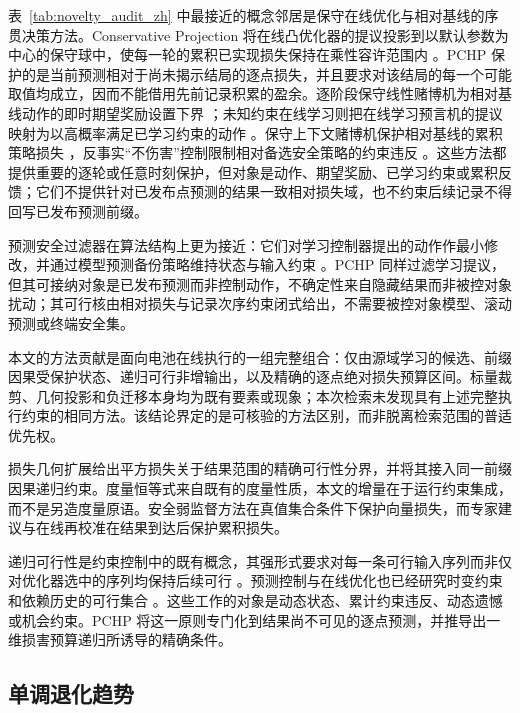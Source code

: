 \documentclass[UTF8,11pt]{ctexart}
\begin{document}
表~\ref{tab:novelty_audit_zh} 中最接近的概念邻居是保守在线优化与相对基线的序贯决策方法。Conservative Projection 将在线凸优化器的提议投影到以默认参数为中心的保守球中，使每一轮的累积已实现损失保持在乘性容许范围内 \citep{bernasconi2021conservative}。PCHP 保护的是当前预测相对于尚未揭示结局的逐点损失，并且要求对该结局的每一个可能取值均成立，因而不能借用先前记录积累的盈余。逐阶段保守线性赌博机为相对基线动作的即时期望奖励设置下界 \citep{moradipari2020stagewise}；未知约束在线学习则把在线学习预言机的提议映射为以高概率满足已学习约束的动作 \citep{sridharan2025unknown}。保守上下文赌博机保护相对基线的累积策略损失 \citep{deb2025conservative}，反事实“不伤害”控制限制相对备选安全策略的约束违反 \citep{vaskov2024donoharm}。这些方法都提供重要的逐轮或任意时刻保护，但对象是动作、期望奖励、已学习约束或累积反馈；它们不提供针对已发布点预测的结果一致相对损失域，也不约束后续记录不得回写已发布预测前缀。

预测安全过滤器在算法结构上更为接近：它们对学习控制器提出的动作作最小修改，并通过模型预测备份策略维持状态与输入约束 \citep{wabersich2021predictive}。PCHP 同样过滤学习提议，但其可接纳对象是已发布预测而非控制动作，不确定性来自隐藏结果而非被控对象扰动；其可行核由相对损失与记录次序约束闭式给出，不需要被控对象模型、滚动预测或终端安全集。

本文的方法贡献是面向电池在线执行的一组完整组合：仅由源域学习的候选、前缀因果受保护状态、递归可行非增输出，以及精确的逐点绝对损失预算区间。标量裁剪、几何投影和负迁移本身均为既有要素或现象；本次检索未发现具有上述完整执行约束的相同方法。该结论界定的是可核验的方法区别，而非脱离检索范围的普适优先权。

损失几何扩展给出平方损失关于结果范围的精确可行性分界，并将其接入同一前缀因果递归约束。度量恒等式来自既有的度量性质，本文的增量在于运行约束集成，而不是另造度量原语。安全弱监督方法在真值集合条件下保护向量损失，而专家建议与在线再校准在结果到达后保护累积损失。

递归可行性是约束控制中的既有概念，其强形式要求对每一条可行输入序列而非仅对优化器选中的序列均保持后续可行 \citep{lofberg2012oops}。预测控制与在线优化也已经研究时变约束和依赖历史的可行集合 \citep{li2021information,garber2024projectionfree,knaup2026recursively}。这些工作的对象是动态状态、累计约束违反、动态遗憾或机会约束。PCHP 将这一原则专门化到结果尚不可见的逐点预测，并推导出一维损害预算递归所诱导的精确条件。

\subsection{单调退化趋势}
\end{document}
